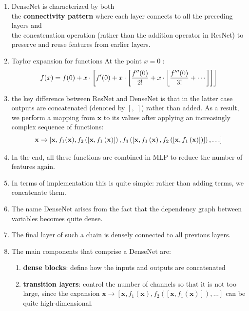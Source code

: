 \begin{enumerate}[itemsep=0.2cm]
    \item DenseNet is characterized by both\\
    the \textbf{connectivity pattern} where each layer connects to all the preceding layers and\\
    the concatenation operation (rather than the addition operator in ResNet) to preserve and reuse features from earlier layers.

    \item Taylor expansion for functions At the point $x = 0$ :
    \[
        \hfill
        f(x) = f(0) + x \cdot \left[f'(0) + x \cdot \left[\frac{f''(0)}{2!}  + x \cdot \left[\frac{f'''(0)}{3!}  + \cdots \right]\right]\right]
        \hfill
    \]

    \item the key difference between ResNet and DenseNet is that in the latter case outputs are concatenated (denoted by $[,\;]$) rather than added. As a result, we perform a mapping from $\mathbf{x}$ to its values after applying an increasingly complex sequence of functions:
    \[
        \hfill
        \mathbf{x} \to \left[
        \mathbf{x},
        f_1(\mathbf{x}),
        f_2\left(\left[\mathbf{x}, f_1\left(\mathbf{x}\right)\right]\right), f_3\left(\left[\mathbf{x}, f_1\left(\mathbf{x}\right), f_2\left(\left[\mathbf{x}, f_1\left(\mathbf{x}\right)\right]\right)\right]\right), \ldots\right]
        \hfill
    \]

    \item In the end, all these functions are combined in MLP to reduce the number of features again.
    
    \item In terms of implementation this is quite simple: rather than adding terms, we concatenate them.
    
    \item The name DenseNet arises from the fact that the dependency graph between variables becomes quite dense. 
    
    \item The final layer of such a chain is densely connected to all previous layers.

    \item The main components that comprise a DenseNet are:
    \begin{enumerate}
        \item \textbf{dense blocks}: define how the inputs and outputs are concatenated
        
        \item \textbf{transition layers}: control the number of channels so that it is not too large, since the expansion $\mathbf{x} \to \left[\mathbf{x}, f_1(\mathbf{x}), f_2\left(\left[\mathbf{x}, f_1\left(\mathbf{x}\right)\right]\right), \ldots \right]$ can be quite high-dimensional.
    \end{enumerate}
\end{enumerate}

